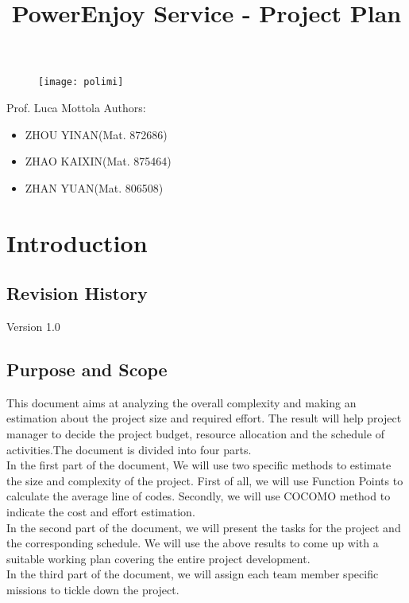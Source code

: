\documentclass{article}
\title{PowerEnjoy Service - Project Plan}
\begin{document}
\begin{titlepage}
\begin{figure}
	\centering
	\texttt{[image: polimi]}
\end{figure}
\maketitle
\centering
Prof. Luca Mottola
\newline
\raggedleft
Authors:
\begin{itemize}
	\raggedleft
	\item ZHOU YINAN(Mat. 872686)
	\item ZHAO KAIXIN(Mat. 875464)
	\item ZHAN YUAN(Mat. 806508)	
\end{itemize}
\end{titlepage}

\tableofcontents
\newpage
\section{Introduction}
\subsection{Revision History}
Version 1.0
\subsection{Purpose and Scope}
This document aims at analyzing the overall complexity and making an estimation about the project size and required effort. The result will help project manager to decide the project budget, resource allocation and the schedule of activities.The document is divided into four parts. \\

In the first part of the document, We will use two specific methods to estimate the size and complexity of the project. First of all, we will use Function Points to calculate the average line of codes. Secondly, we will use COCOMO method to indicate the cost and effort estimation. \\

In the second part of the document, we will present the tasks for the project and the corresponding schedule. We will use the above results to come up with a suitable working plan covering the entire project development.\\

In the third part of the document, we will assign each team member specific missions to tickle down the project.\\
\end{document}
